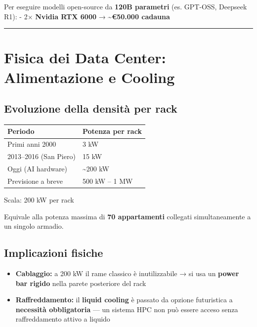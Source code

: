 \documentclass[
  italian,
  openany]{book}
\newcounter{none} %
\providecommand{\tightlist}{%
  \setlength{\itemsep}{0pt}\setlength{\parskip}{0pt}}
\begin{document}
Per eseguire modelli open-source da \textbf{120B parametri} (es.
GPT-OSS, Deepseek R1): - 2× \textbf{Nvidia RTX 6000} →
\textasciitilde{}\textbf{€50.000 cadauna}

\begin{center}\rule{0.5\linewidth}{0.5pt}\end{center}

\section{Fisica dei Data Center: Alimentazione e
Cooling}\label{fisica-dei-data-center-alimentazione-e-cooling}

\subsection{Evoluzione della densità per
rack}\label{evoluzione-della-densituxe0-per-rack}

{\def\LTcaptype{none} %
\begin{longtable}[]{@{}ll@{}}
\toprule\noalign{}
Periodo & Potenza per rack \\
\midrule\noalign{}
\endhead
\bottomrule\noalign{}
\endlastfoot
Primi anni 2000 & 3 kW \\
2013--2016 (San Piero) & 15 kW \\
Oggi (AI hardware) & \textasciitilde200 kW \\
Previsione a breve & 500 kW -- 1 MW \\
\end{longtable}
}

\begin{calloutwarning}{Scala: 200 kW per rack}

Equivale alla potenza massima di \textbf{70 appartamenti} collegati
simultaneamente a un singolo armadio.

\end{calloutwarning}

\subsection{Implicazioni fisiche}\label{implicazioni-fisiche}

\begin{itemize}
\tightlist
\item
  \textbf{Cablaggio:} a 200 kW il rame classico è inutilizzabile → si
  usa un \textbf{power bar rigido} nella parete posteriore del rack
\item
  \textbf{Raffreddamento:} il \textbf{liquid cooling} è passato da
  opzione futuristica a \textbf{necessità obbligatoria} --- un sistema
  HPC non può essere acceso senza raffreddamento attivo a liquido
\end{itemize}
\end{document}
